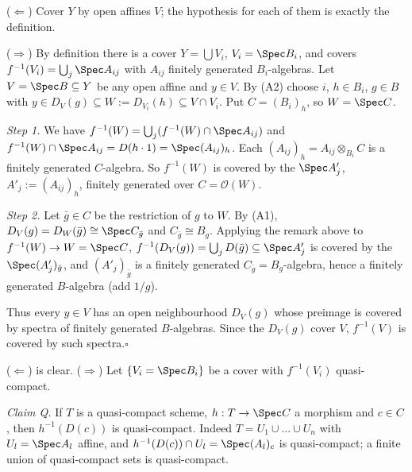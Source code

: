 \documentclass[11pt]{article}
\begin{document}
\pf
($\Leftarrow$) Cover $Y$ by open affines $V$; the hypothesis for each of them is exactly the definition.

($\Rightarrow$) By definition there is a cover $Y=\bigcup V_i$, $V_i=\Spec B_i$, and covers $f^{-1}(V_i)=\bigcup_j\Spec A_{ij}$ with $A_{ij}$ finitely generated $B_i$-algebras. Let $V=\Spec B\subseteq Y$ be any open affine and $y\in V$. By (A2) choose $i$, $h\in B_i$, $g\in B$ with $y\in D_V(g)\subseteq W:=D_{V_i}(h)\subseteq V\cap V_i$. Put $C=(B_i)_h$, so $W=\Spec C$.

\emph{Step 1.} We have $f^{-1}(W)=\bigcup_j (f^{-1}(W)\cap\Spec A_{ij})$ and $f^{-1}(W)\cap\Spec A_{ij}=D(h\cdot 1)=\Spec (A_{ij})_h$. Each $(A_{ij})_h=A_{ij}\otimes_{B_i}C$ is a finitely generated $C$-algebra. So $f^{-1}(W)$ is covered by the $\Spec A'_j$, $A'_j:=(A_{ij})_h$, finitely generated over $C=\mathcal O(W)$.

\emph{Step 2.} Let $\bar g\in C$ be the restriction of $g$ to $W$. By (A1), $D_V(g)=D_W(\bar g)\cong\Spec C_{\bar g}$ and $C_{\bar g}\cong B_g$. Applying the remark above to $f^{-1}(W)\to W=\Spec C$, $f^{-1}(D_V(g))=\bigcup_j D(\bar g)\subseteq\Spec A_j'$ is covered by the $\Spec (A'_j)_{\bar g}$, and $(A'_j)_{\bar g}$ is a finitely generated $C_{\bar g}=B_g$-algebra, hence a finitely generated $B$-algebra (add $1/g$).

Thus every $y\in V$ has an open neighbourhood $D_V(g)$ whose preimage is covered by spectra of finitely generated $B$-algebras. Since the $D_V(g)$ cover $V$, $f^{-1}(V)$ is covered by such spectra.\hfill$\square$

\pf
($\Leftarrow$) is clear. ($\Rightarrow$) Let $\{V_i=\Spec B_i\}$ be a cover with $f^{-1}(V_i)$ quasi-compact.

\emph{Claim Q.} If $T$ is a quasi-compact scheme, $h:T\to\Spec C$ a morphism and $c\in C$, then $h^{-1}(D(c))$ is quasi-compact. Indeed $T=U_1\cup\dots\cup U_n$ with $U_l=\Spec A_l$ affine, and $h^{-1}(D(c))\cap U_l=\Spec (A_l)_c$ is quasi-compact; a finite union of quasi-compact sets is quasi-compact.
\end{document}

